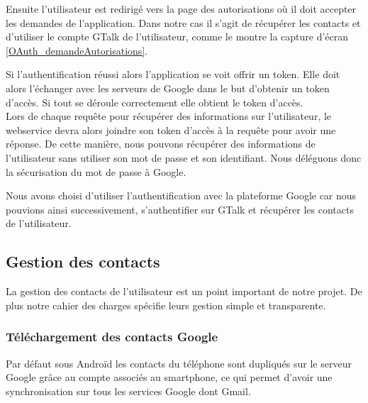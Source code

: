Ensuite l'utilisateur est redirigé vers la page des autorisations où il doit accepter les demandes de l'application.
Dans notre cas il s'agit de récupérer les contacts et d'utiliser le compte GTalk de l'utilisateur, comme le montre la capture d'écran \ref{OAuth_demandeAutorisations}.

Si l'authentification réussi alors l'application se voit offrir un token.
Elle doit alors l'échanger avec les serveurs de Google dans le but d'obtenir un token d'accès.
Si tout se déroule correctement elle obtient le token d'accès.
\\


Lors de chaque requête pour récupérer des informations sur l'utilisateur, le webservice devra alors
joindre son token d'accès à la requête pour avoir une réponse. De cette manière, nous pouvons récupérer
des informations de l'utilisateur sans utiliser son mot de passe et son identifiant. Nous déléguons donc
la sécurisation du mot de passe à Google.

Nous avons choisi d'utiliser l'authentification avec la plateforme Google car nous pouvions ainsi 
successivement, s'authentifier sur GTalk et récupérer les contacts de l'utilisateur.




\subsection{Gestion des contacts}

La gestion des contacts de l'utilisateur est un point important de notre projet.
De plus notre cahier des charges spécifie leurs gestion simple et transparente.


\subsubsection{Téléchargement des contacts Google}
\label{Téléchargement des contacts Google}

Par défaut sous Androïd les contacts du téléphone sont dupliqués sur le serveur Google grâce au compte associés au smartphone, ce qui permet d'avoir une synchronisation sur tous les services Google dont Gmail.

